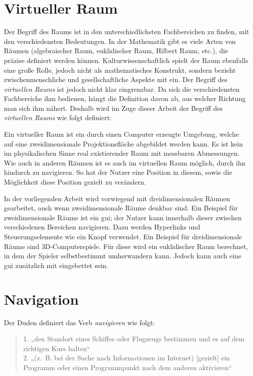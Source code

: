 \section{Virtueller Raum}
Der Begriff des Raums ist in den unterschiedlichsten Fachbereichen zu finden, mit den verschiedensten Bedeutungen.
In der Mathematik gibt es viele Arten von Räumen (algebraischer Raum, euklidischer Raum, Hilbert Raum, etc.), die präzise definiert werden können.
Kulturwissenschaftlich spielt der Raum ebenfalls eine große Rolle, jedoch nicht als mathematisches Konstrukt, sondern bezieht zwischenmenschliche und gesellschaftliche Aspekte mit ein.
Der Begriff des \textit{virtuellen Raums} ist jedoch nicht klar eingrenzbar.
Da sich die verschiedensten Fachbereiche ihm bedienen, hängt die Definition davon ab, aus welcher Richtung man sich ihm nähert.
Deshalb wird im Zuge dieser Arbeit der Begriff des \textit{virtuellen Raums} wie folgt definiert:

Ein virtueller Raum ist ein durch einen Computer erzeugte Umgebung, welche auf eine zweidimensionale Projektionsfläche abgebildet werden kann.
Es ist kein im physikalischen Sinne real existierender Raum mit messbaren Abmessungen.
Wie auch in anderen Räumen ist es auch im virtuellen Raum möglich, durch ihn hindurch zu navigieren.
So hat der Nutzer eine Position in diesem, sowie die Möglichkeit diese Position gezielt zu verändern.

In der vorliegenden Arbeit wird vorwiegend mit dreidimensionalen Räumen gearbeitet, auch wenn zweidimensionale Räume denkbar sind.
Ein Beispiel für zweidimensionale Räume ist ein \ac{gui}; der Nutzer kann innerhalb dieser zwischen verschiedenen Bereichen navigieren.
Dazu werden Hyperlinks und Steuerungselemente wie ein Knopf verwendet.
Ein Beispiel für dreidimensionale Räume sind 3D-Computerspiele.
Für diese wird ein euklidischer Raum berechnet, in dem der Spieler selbstbestimmt umherwandern kann.
Jedoch kann auch eine \ac{gui} zusätzlich mit eingebettet sein.

\section{Navigation}
Der Duden definiert das Verb \textit{navigieren} wie folgt:

\begin{quote}
    1. „den Standort eines Schiffes oder Flugzeugs bestimmen und es auf dem richtigen Kurs halten“\\
    2. „(z. B. bei der Suche nach Informationen im Internet) [gezielt] ein Programm oder einen Programmpunkt nach dem anderen aktivieren“
    \cite{DudenNavigierenRechtschreibung}
\end{quote}

